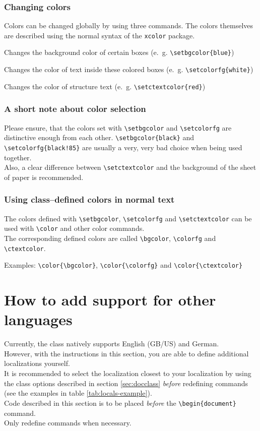 \documentclass[11pt]{ltxdoc}
\begin{document}
	\subsubsection{Changing colors}
	Colors can be changed globally by using three commands. The colors themselves are described using the normal syntax of the \texttt{xcolor} package.
	
	\medskip
	\DescribeMacro{\setbgcolor}
	Changes the background color of certain boxes (e.~g. \verb|\setbgcolor{blue}|)
	
	\medskip
	\DescribeMacro{\setcolorfg}
	Changes the color of text inside these colored boxes (e.~g. \verb|\setcolorfg{white}|)
	
	\medskip
	\DescribeMacro{\setctextcolor}
	Changes the color of structure text (e.~g. \verb|\setctextcolor{red}|)
	
	
	\subsubsection{A short note about color selection}
	Please ensure, that the colors set with \verb|\setbgcolor| and \verb|\setcolorfg| are distinctive enough from each other. \verb|\setbgcolor{black}| and \verb|\setcolorfg{black!85}| are usually a very, very bad choice when being used together. \\
	Also, a clear difference between \verb|\setctextcolor| and the background of the sheet of paper is recommended.
	
	
	\subsubsection{Using class--defined colors in normal text}
	The colors defined with \verb|\setbgcolor|, \verb|\setcolorfg| and \verb|\setctextcolor| can be used with \verb|\color| and other color commands. \\
	The corresponding defined colors are called \verb|\bgcolor|, \verb|\colorfg| and \verb|\ctextcolor|.
	
	\medskip
	Examples: \verb|\color{\bgcolor}|, \verb|\color{\colorfg}| and \verb|\color{\ctextcolor}|
	
	
	
	\section{How to add support for other languages}
	Currently, the class natively supports English (GB/US) and German. \\
	However, with the instructions in this section, you are able to define additional localizations yourself. \\
	It is recommended to select the localization closest to your localization by using the class options described in section \ref{sec:docclass} \textit{before} redefining commands (see the examples in table \ref{tab:locals-example}). \\
	Code described in this section is to be placed \textit{before} the \verb|\begin{document}| command. \\
	Only redefine commands when necessary.
	
\end{document}
